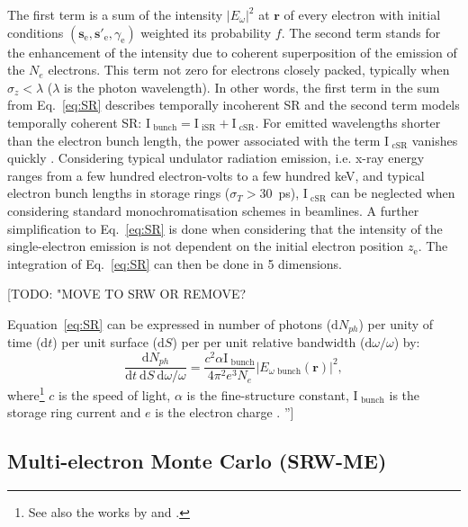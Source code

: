 \documentclass{iucr}              %
\newcommand{\todo}[1]{{\color{red}[TODO: "#1'']}}
\begin{document}
The first term is a sum of the intensity $|E_{\omega}|^2$ at $\textbf{r}$ of every electron with initial conditions $(\textbf{s}_\text{e}, \textbf{s}'_\text{e},\gamma_\text{e})$ weighted its probability $f$. The second term stands for the enhancement of the intensity due to coherent superposition of the emission of the $N_e$ electrons. This term not zero for electrons closely packed, typically when $\sigma_z < \lambda$ ($\lambda$ is the photon wavelength).  In other words,    
the first term in the sum from Eq.~\ref{eq:SR} describes temporally incoherent SR and the second term models temporally coherent SR: $\text{I}_\text{~bunch} = \text{I}_\text{~iSR}+\text{I}_\text{~cSR}$. For emitted wavelengths shorter than the electron bunch length, the power associated with the term $\text{I}_\text{~cSR}$ vanishes quickly \cite{CSR,Wiedemann2015}.
Considering typical undulator radiation emission, i.e. x-ray energy ranges from a few hundred electron-volts to a few hundred keV, and typical electron bunch lengths in storage rings ($\sigma_{T}>30$~ps), $\text{I}_\text{~cSR}$ can be neglected when considering standard monochromatisation schemes in beamlines. A further simplification to Eq.~\ref{eq:SR} is done when considering that the intensity of the single-electron emission is not dependent on the initial electron position $z_\text{e}$. The integration of Eq.~\ref{eq:SR} can then be done in 5 dimensions.

\todo{MOVE TO SRW OR REMOVE?

Equation~\ref{eq:SR} can be expressed in number of photons ($\text{d}N_{ph}$) per unity of time ($\text{d}t$) per unit surface ($\text{d}S$) per per unit relative bandwidth ($\text{d}\omega\big/\omega$) by:
\begin{equation}
\frac{\text{d}N_{ph}}{\text{d}t~\text{d}S~\text{d}\omega\big/\omega}=\frac{c^2\alpha \text{I}_\text{~bunch}}{4\pi^2e^3N_e}|E_{\omega\text{~bunch}}(\textbf{r})|^2,
\label{eq:SR_ph}
\end{equation}
where\footnote{See also the works by \citeasnoun{kim1995} and \citeasnoun{hulbert1992}.} $c$ is the speed of light, $\alpha$ is the fine-structure constant, $\text{I}_\text{~bunch}$ is the storage ring current and $e$ is the electron charge \cite{Chubar1995}.
}

\subsection{Multi-electron Monte Carlo (SRW-ME)}
\end{document}
